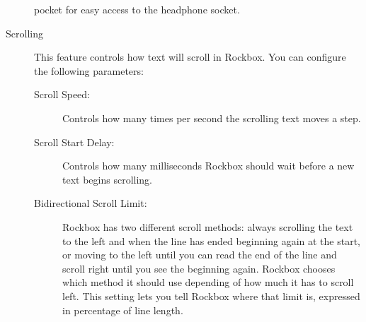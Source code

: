\begin{description}
{\begin{description}
         pocket for easy access to the headphone socket.
    \end{description}
  }
%
  \item[Scrolling]
    This feature controls how text will scroll in Rockbox. You can configure
    the following parameters:
    \begin{description}
    \item[Scroll Speed:]
      Controls how many times per second the scrolling text moves a step.
    \item[Scroll Start Delay:]
      Controls how many milliseconds Rockbox should wait before a new
      text begins scrolling.
    \item[Bidirectional Scroll Limit:]
      Rockbox has two different scroll methods: always scrolling the text
      to the left and when the line has ended beginning again at the start,
      or moving to the left until you can read the end of the line and scroll
      right until you see the beginning again. Rockbox chooses which method
      it should use depending of how much it has to scroll left. This setting
      lets you tell Rockbox where that limit is, expressed in percentage of
      line length.
\end{description}
\end{description}
